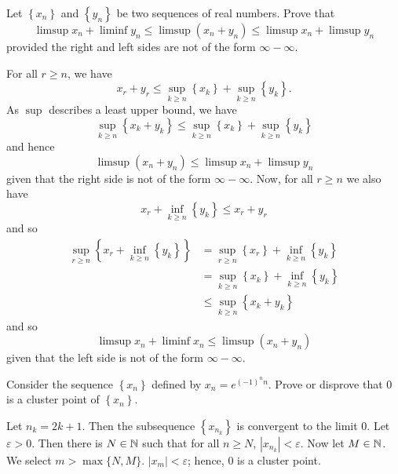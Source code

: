 \documentclass[a4paper, answers]{exam}
\begin{document}
\begin{questions}
	\question
		Let $\left\{ x_n \right\}$ and $\left\{ y_n \right\}$
		be two sequences of real numbers.
		Prove that
		\[
			\limsup x_n + \liminf y_n
			\leq \limsup(x_n + y_n)
			\leq \limsup x_n + \limsup y_n
		\]
		provided the right and left sides are not of the form 
		$\infty - \infty$.
		\begin{solution}
			For all $r \geq n$, we have
			\[
				x_r + y_r 
				\leq \sup_{k \geq n} \left\{ x_k \right\}
					+ \sup_{k \geq n} \left\{ y_k \right\}.
			\]
			As $\sup$ describes a least upper bound, we have
			\[
				\sup_{k \geq n} \left\{ x_k + y_k \right\}
				\leq \sup_{k \geq n} \left\{ x_k \right\}
					+ \sup_{k \geq n} \left\{ y_k \right\}
			\]
			and hence
			\[
				\limsup(x_n + y_n) \leq \limsup x_n + \limsup y_n
			\]
			given that the right side is not of the form $\infty - \infty$.
			Now, for all $r \geq n$ we also have
			\[
				x_r + \inf_{k \geq n} \left\{ y_k \right\} \leq x_r + y_r
			\]
			and so
			\begin{align*}
				\sup_{r \geq n}
					\left\{ 
						x_r + \inf_{k \geq n} \left\{ y_k \right\} 
					\right\}
				&= \sup_{r \geq n}
					\left\{ x_r \right\} 
					+ \inf_{k \geq n} \left\{ y_k \right\} \\
				&= \sup_{k \geq n}
					\left\{ x_k \right\} 
					+ \inf_{k \geq n} \left\{ y_k \right\} \\
				&\leq \sup_{k \geq n} \left\{ x_k + y_k \right\}
			\end{align*}
			and so
			\[
				\limsup x_n + \liminf x_n \leq \limsup(x_n + y_n)
			\]
			given that the left side is not of the form $\infty - \infty$.
		\end{solution}
		
	\question
		Consider the sequence $\left\{ x_n \right\}$
		defined by $x_n = e^{(-1)^nn}$.
		Prove or disprove that $0$ is a cluster point of 
		$\left\{ x_n \right\}$.
		\begin{solution}
			Let $n_k = 2k+1$.
			Then the subsequence $\left\{ x_{n_k} \right\}$
			is convergent to the limit $0$.
			Let $\varepsilon > 0$.
			Then there is $N \in \mathbb{N}$ such that for all $n \geq N$,
			$\left\lvert x_{n_k} \right\rvert < \varepsilon$.
			Now let $M \in \mathbb{N}$.
			We select $m > \max\{N, M\}$.
			$|x_m| < \varepsilon$; hence, $0$ is a cluster point.
		\end{solution}
\end{questions}
\end{document}
